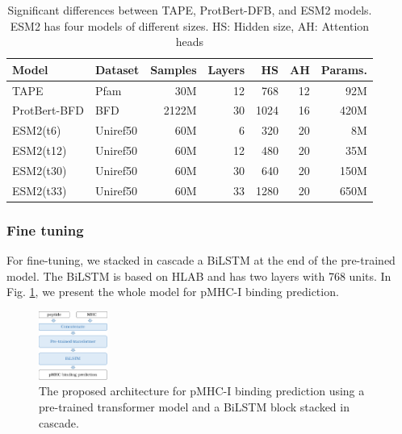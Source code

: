 \begin{table}[]%
	\centering
	\caption{Significant differences between TAPE, ProtBert-DFB, and ESM2 models. ESM2 has four models of different sizes. HS: Hidden size, AH: Attention heads}
	\label{tab:pretrained}%
	\scriptsize
	\begin{tabular}{llrrrrr}
		\hline
		\textbf{Model}   & \textbf{Dataset} & \textbf{Samples} & \textbf{Layers} & \textbf{HS} & \textbf{AH} & \textbf{Params.} \\
		\hline
		TAPE             & Pfam             & 30M                   & 12              & 768                  & 12                       & 92M                 \\
		ProtBert-BFD     & BFD              & 2122M                 & 30              & 1024                 & 16                       & 420M                \\
		ESM2(t6)  & Uniref50         & 60M                   & 6               & 320                  & 20                       & 8M                  \\
		ESM2(t12)  & Uniref50         & 60M                   & 12              & 480                  & 20                       & 35M                 \\
		ESM2(t30) & Uniref50         & 60M                   & 30              & 640                  & 20                       & 150M                \\
		ESM2(t33)  & Uniref50         & 60M                   & 33              & 1280                 & 20                       & 650M               \\
		\hline
	\end{tabular}
	
\end{table}
 
 
 \subsubsection{Fine tuning}\label{sec:fine-tuned}
 
 For fine-tuning, we stacked in cascade a BiLSTM at the end of the pre-trained model. The BiLSTM is based on HLAB \cite{zhang2022hlab} and has two layers with 768 units.  In Fig. \ref{fig:finetune}, we present the whole model for pMHC-I binding prediction. 
 
 
 \begin{figure}[h]
 	\centering\includegraphics[width=0.2\textwidth]{../img/proposal/pipeline}
 	\caption{The proposed architecture for pMHC-I binding prediction using a pre-trained transformer model and a BiLSTM block stacked in cascade.}
 	\label{fig:finetune}
 \end{figure}
 
